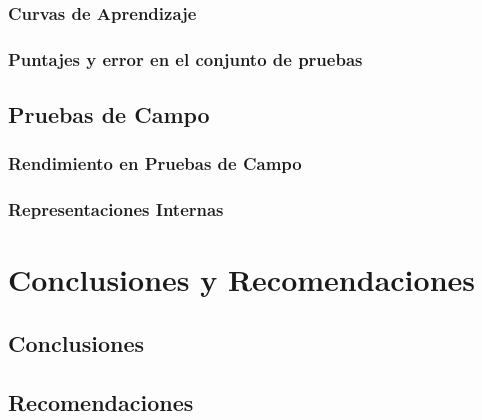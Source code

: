 \documentclass[]{beamer}
\begin{document}
            \subsubsection*{Curvas de Aprendizaje}
            \subsubsection*{Puntajes y error en el conjunto de pruebas}
        \subsection{Pruebas de Campo}
            \subsubsection*{Rendimiento en Pruebas de Campo}
            \subsubsection*{Representaciones Internas}

    \section{Conclusiones y Recomendaciones}
        \subsection{Conclusiones}
        \subsection{Recomendaciones}

    \begin{frame}
    \end{frame}
\end{document}
